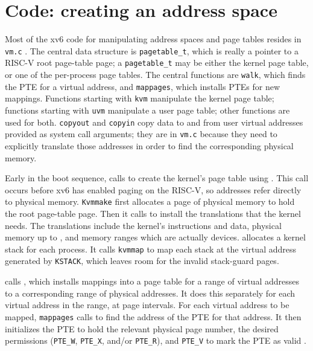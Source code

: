 \section{Code: creating an address space}

Most of the xv6 code for manipulating address spaces and
page tables resides in {\tt vm.c}
.
The central data structure is {\tt pagetable\_t}, which
is really a pointer to a RISC-V root page-table page;
a {\tt pagetable\_t} may be either the kernel
page table, or one of the per-process page tables.
The central functions are {\tt walk},
which finds the PTE for a virtual address,
and {\tt mappages}, which installs PTEs for new mappings.
Functions starting with {\tt kvm} manipulate
the kernel page table; functions starting with {\tt uvm}
manipulate a user page table; other functions are
used for both.
{\tt copyout} and {\tt copyin} copy data to and from
user virtual addresses provided as system call arguments;
they are in {\tt vm.c} because they need to explicitly
translate those addresses in order to find the corresponding
physical memory.

Early in the boot sequence,
calls
to create the kernel's page table using
.
This call occurs before xv6 has enabled paging on the RISC-V,
so addresses refer directly to physical memory.
\lstinline{Kvmmake}
first allocates a page of physical memory to hold the root page-table page.
Then it calls
to install the translations that the kernel needs.
The translations include the kernel's
instructions and data, physical memory up to
,
and memory ranges which are actually devices.
allocates a kernel stack for each
process. It calls \lstinline{kvmmap} to map each stack at the virtual address generated by
\lstinline{KSTACK}, which leaves room for the invalid stack-guard
pages.

calls
,
which
installs mappings into a page table
for a range of virtual addresses to
a corresponding range of physical addresses.
It does this separately for each virtual address in the range,
at page intervals.
For each virtual address to be mapped,
\lstinline{mappages}
calls
to find the address of the PTE for that address.
It then initializes the PTE to hold the relevant physical page
number, the desired permissions 
(\lstinline{PTE_W},
\lstinline{PTE_X},
and/or
\lstinline{PTE_R}),
and
\lstinline{PTE_V}
to mark the PTE as valid
.

